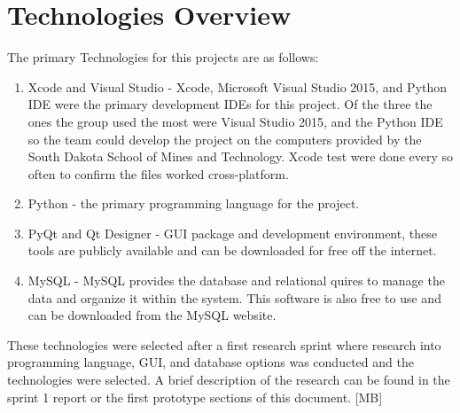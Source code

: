 \section{Technologies Overview}
\textmd{The primary Technologies for this projects are as follows:}

\begin{enumerate}
\item Xcode and Visual Studio - Xcode, Microsoft Visual Studio 2015, and Python IDE were the primary development IDEs for this project. Of the three the ones the group used the most were Visual Studio 2015, and the Python IDE so the team could develop the project on the computers provided by the South Dakota School of Mines and Technology. Xcode test were done every so often to confirm the files worked cross-platform.
\item Python - the primary programming language for the project.
\item PyQt and Qt Designer - GUI package and development environment, these tools are publicly available and can be downloaded for free off the internet. 
\item MySQL - MySQL provides the database and relational quires to manage the data and organize it within the system. This software is also free to use and can be downloaded from the MySQL website.
\end{enumerate}




\textmd{These technologies were selected after a first research sprint where research into programming language, GUI, and database options was conducted and the technologies were selected. A brief description of the research can be found in the sprint 1 report or the first prototype sections of this document. [MB]}

